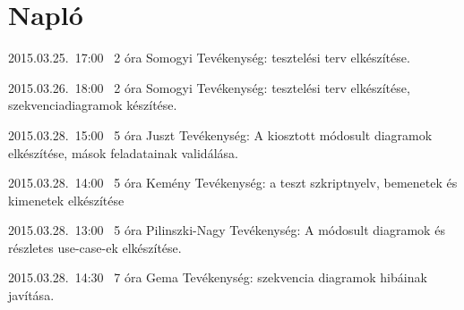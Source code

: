 %
\section{Napló}

\begin{naplo}

\bejegyzes
{2015.03.25.~17:00~}
{2 óra}
{Somogyi}
{Tevékenység: tesztelési terv elkészítése.}

\bejegyzes
{2015.03.26.~18:00~}
{2 óra}
{Somogyi}
{Tevékenység: tesztelési terv elkészítése, szekvenciadiagramok készítése.}


\bejegyzes
{2015.03.28.~15:00~}
{5 óra}
{Juszt}
{Tevékenység: A kiosztott módosult diagramok elkészítése, mások feladatainak validálása.}

\bejegyzes
{2015.03.28.~14:00~}
{5 óra}
{Kemény}
{Tevékenység: a teszt szkriptnyelv, bemenetek és kimenetek elkészítése }

\bejegyzes
{2015.03.28.~13:00~}
{5 óra}
{Pilinszki-Nagy}
{Tevékenység: A módosult diagramok és részletes use-case-ek elkészítése.}

\bejegyzes
{2015.03.28.~14:30~}
{7 óra}
{Gema}
{Tevékenység: szekvencia diagramok hibáinak javítása.}

\end{naplo}

